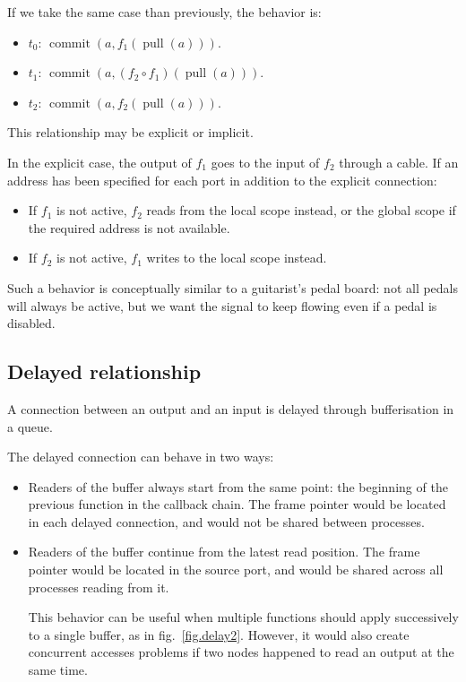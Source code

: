 \documentclass{article}
\DeclareMathOperator{\commit}{commit}
\DeclareMathOperator{\pull}{pull}
\begin{document}
If we take the same case than previously, the behavior is:
\begin{itemize}
  \item $t_0$: $\commit(a, f_1(\pull(a)))$.
  \item $t_1$: $\commit(a, (f_2 \circ f_1)(\pull(a)))$.
  \item $t_2$: $\commit(a, f_2(\pull(a)))$. 
\end{itemize}

This relationship may be explicit or implicit.

In the explicit case, the output of $f_1$ goes to the input of $f_2$ through a cable. 
If an address has been specified for each port in addition to the explicit connection:
\begin{itemize}
	\item If $f_1$ is not active, $f_2$ reads from the local scope instead, or the global scope if the required address is not available.
	\item If $f_2$ is not active, $f_1$ writes to the local scope instead.
\end{itemize}

Such a behavior is conceptually similar to a guitarist's pedal board: not all pedals will always be active, but we want the signal to keep flowing even if a pedal is disabled.

\subsection{Delayed relationship}
A connection between an output and an input is delayed through bufferisation in a queue.
	
The delayed connection can behave in two ways:
\begin{itemize}
  \item Readers of the buffer always start from the same point: the beginning of the previous function in the callback chain. 
  The frame pointer would be located in each delayed connection, and would not be shared between processes.
  \item Readers of the buffer continue from the latest read position. 
  The frame pointer would be located in the source port, and would be shared across all processes reading from it.

  This behavior can be useful when multiple functions should apply successively to a single buffer, as in fig.~\ref{fig.delay2}.
  However, it would also create concurrent accesses problems if two nodes happened to read an output at the same time.
  
  
\end{itemize}
\end{document}

